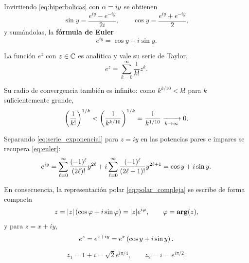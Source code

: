Invirtiendo \eqref{eq:hiperbolicas} con $\alpha=iy$ se obtienen
\begin{equation}
  \label{eq:seno_coseno_exponencial}
  \sin y=\frac{e^{iy}-e^{-iy}}{2i},
  \qquad
  \cos y=\frac{e^{iy}+e^{-iy}}{2},
\end{equation}
y sum\'andolas, la \textbf{f\'ormula de Euler}
\begin{equation}
  \label{eq:euler}
  e^{iy}=\cos y+i\sin y .
\end{equation}

\begin{definicion}
  \label{def:exponencial}
  La funci\'on $e^z$ con $z\in\mathbb{C}$ es anal\'itica y vale su serie de Taylor,
  \begin{equation}
    \label{eq:serie_exponencial}
    e^z=\sum_{k=0}^{\infty}\frac{1}{k!}z^k .
  \end{equation}
\end{definicion}

Su radio de convergencia tambi\'en es infinito: como $k^{k/10}<k!$ para $k$
suficientemente grande,
\begin{equation}
  \label{eq:radio_exponencial}
  \left( \frac{1}{k!} \right)^{1/k}<\left( \frac{1}{k^{k/10}} \right)^{1/k}
    =\frac{1}{k^{1/10}}\xrightarrow[k\rightarrow\infty]{}0 .
\end{equation}

Separando \eqref{eq:serie_exponencial} para $z=iy$ en las potencias pares e
impares se recupera \eqref{eq:euler}:
\begin{equation}
  \label{eq:exponencial_euler}
  \small
  e^{iy}=\sum_{\ell=0}^{\infty}\frac{(-1)^\ell}{(2\ell)!}y^{2\ell}
    +i\sum_{\ell=0}^{\infty}\frac{(-1)^\ell}{(2\ell+1)!}y^{2\ell+1}
    =\cos y+i\sin y .
\end{equation}

En consecuencia, la representaci\'on polar \eqref{eq:polar_compleja} se
escribe de forma compacta
\begin{equation}
  \label{eq:polar_exponencial}
  z=\lvert z \rvert\left( \cos\varphi+i\sin\varphi \right)=\lvert z \rvert e^{i\varphi},
  \qquad \varphi=\operatorname{\mathbf{arg}}(z),
\end{equation}
y para $z=x+iy$,
\begin{equation}
  \label{eq:exponencial_cartesiana}
  e^{z}=e^{x+iy}=e^{x}\left( \cos y+i\sin y \right) .
\end{equation}

\begin{ejemplo}
  \label{ej:polar_exponencial}
  \begin{equation}
    \label{eq:ejemplos_polar}
    z_1=1+i=\sqrt{2}e^{i\pi/4},
    \qquad
    z_2=i=e^{i\pi/2} .
  \end{equation}
\end{ejemplo}

